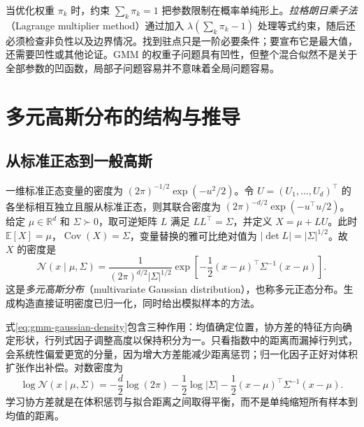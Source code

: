 \documentclass[UTF8,12pt,a4paper,fontset=fandol]{ctexart}
\begin{document}
当优化权重 $\pi_k$ 时，约束 $\sum_k\pi_k=1$ 把参数限制在概率单纯形上。\emph{拉格朗日乘子法}（Lagrange multiplier method）通过加入 $\lambda(\sum_k\pi_k-1)$ 处理等式约束，随后还必须检查非负性以及边界情况。找到驻点只是一阶必要条件；要宣布它是最大值，还需要凹性或其他论证。GMM 的权重子问题具有凹性，但整个混合似然不是关于全部参数的凹函数，局部子问题容易并不意味着全局问题容易。

\section{多元高斯分布的结构与推导}
\label{sec:gmm-gaussian}

\subsection{从标准正态到一般高斯}
一维标准正态变量的密度为 $(2\pi)^{-1/2}\exp(-u^2/2)$。令 $U=(U_1,\ldots,U_d)^\top$ 的各坐标相互独立且服从标准正态，则其联合密度为 $(2\pi)^{-d/2}\exp(-u^\top u/2)$。给定 $\mu\in\mathbb R^d$ 和 $\Sigma\succ0$，取可逆矩阵 $L$ 满足 $LL^\top=\Sigma$，并定义 $X=\mu+LU$。此时 $\mathbb E[X]=\mu$，$\operatorname{Cov}(X)=\Sigma$，变量替换的雅可比绝对值为 $|\det L|=|\Sigma|^{1/2}$。故 $X$ 的密度是
\begin{equation}
\mathcal N(x\mid\mu,\Sigma)=\frac{1}{(2\pi)^{d/2}|\Sigma|^{1/2}}
\exp\!\left[-\frac12(x-\mu)^\top\Sigma^{-1}(x-\mu)\right].
\label{eq:gmm-gaussian-density}
\end{equation}
这是\emph{多元高斯分布}（multivariate Gaussian distribution），也称多元正态分布。生成构造直接证明密度已归一化，同时给出模拟样本的方法。

式\eqref{eq:gmm-gaussian-density}包含三种作用：均值确定位置，协方差的特征方向确定形状，行列式因子调整高度以保持积分为一。只看指数中的距离而漏掉行列式，会系统性偏爱更宽的分量，因为增大方差能减少距离惩罚；归一化因子正好对体积扩张作出补偿。对数密度为
\begin{equation}
\log\mathcal N(x\mid\mu,\Sigma)=-\frac d2\log(2\pi)-\frac12\log|\Sigma|
-\frac12(x-\mu)^\top\Sigma^{-1}(x-\mu).
\label{eq:gmm-log-gaussian}
\end{equation}
学习协方差就是在体积惩罚与拟合距离之间取得平衡，而不是单纯缩短所有样本到均值的距离。
\end{document}

